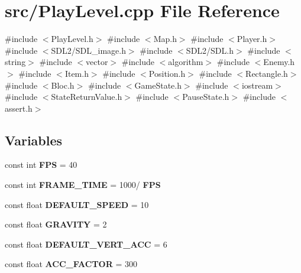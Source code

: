 \section{src/\+Play\+Level.cpp File Reference}
\label{_play_level_8cpp}
{\ttfamily \#include $<$Play\+Level.\+h$>$}\newline
{\ttfamily \#include $<$Map.\+h$>$}\newline
{\ttfamily \#include $<$Player.\+h$>$}\newline
{\ttfamily \#include $<$S\+D\+L2/\+S\+D\+L\+\_\+image.\+h$>$}\newline
{\ttfamily \#include $<$S\+D\+L2/\+S\+D\+L.\+h$>$}\newline
{\ttfamily \#include $<$string$>$}\newline
{\ttfamily \#include $<$vector$>$}\newline
{\ttfamily \#include $<$algorithm$>$}\newline
{\ttfamily \#include $<$Enemy.\+h$>$}\newline
{\ttfamily \#include $<$Item.\+h$>$}\newline
{\ttfamily \#include $<$Position.\+h$>$}\newline
{\ttfamily \#include $<$Rectangle.\+h$>$}\newline
{\ttfamily \#include $<$Bloc.\+h$>$}\newline
{\ttfamily \#include $<$Game\+State.\+h$>$}\newline
{\ttfamily \#include $<$iostream$>$}\newline
{\ttfamily \#include $<$State\+Return\+Value.\+h$>$}\newline
{\ttfamily \#include $<$Pause\+State.\+h$>$}\newline
{\ttfamily \#include $<$assert.\+h$>$}\newline
\subsection*{Variables}
\begin{DoxyCompactItemize}
\item 
const int \textbf{ F\+PS} = 40
\item 
const int \textbf{ F\+R\+A\+M\+E\+\_\+\+T\+I\+ME} = 1000/\textbf{ F\+PS}
\item 
const float \textbf{ D\+E\+F\+A\+U\+L\+T\+\_\+\+S\+P\+E\+ED} = 10
\item 
const float \textbf{ G\+R\+A\+V\+I\+TY} = 2
\item 
const float \textbf{ D\+E\+F\+A\+U\+L\+T\+\_\+\+V\+E\+R\+T\+\_\+\+A\+CC} = 6
\item 
const float \textbf{ A\+C\+C\+\_\+\+F\+A\+C\+T\+OR} = 300
\end{DoxyCompactItemize}


